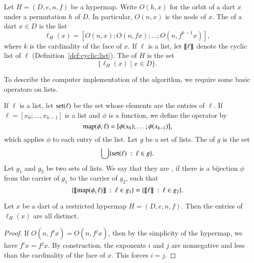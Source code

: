\begin{definition}[listing]
  Let $H=(D,e,n,f)$ be a hypermap.  Write $O(h,x)$ for the orbit of a
  dart $x$ under a permutation $h$ of $D$.  In particular, $O(n,x)$ is
  the node of $x$.  The  of a dart $x\in D$ is the
  list
\[
\ell_H(x) = [O(n,x);O(n,f x);\ldots;O(n,f^{k-1} x)   ], 
\]
where $k$ is the cardinality of the face of $x$.  If $\ell$ is a list,
let ${\llbracket{\ell}\rrbracket}$ denote the cyclic list of $\ell$
(Definition~\ref{def:cyclic:list}).  The  of $H$ is
the set
\[
\{\ell_H(x) \mid x\in D\}.
\]
\end{definition}
%
%

To describe the computer implementation of the algorithm, we require
some basic operators on lists.

\begin{definition}
  If $\ell$ is a list, let ${\operatorname{set}}(\ell)$ be the set whose elements
  are the entries of $\ell$.  If $\ell=[x_0;\ldots,x_{k-1}]$ is a list
  and $\phi$ is a function, we define the operator  by
\[
{\operatorname{map}}(\phi,\ell) = [\phi(x_0);\ldots;\phi(x_{k-1})],
\]
which applies $\phi$ to each entry of the list.  Let $g$ be a set of
lists.  The  of $g$ is the set
\[
\bigcup \{ {\operatorname{set}}(\ell) \ :\  \ell\in g\}.
\]
Let $g_1$ and $g_2$ be two sets of lists.  We say that they are
, 
if there is a bijection $\phi$ from the
carrier of $g_1$ to the carrier of $g_2$, such that
\[
\{ {\llbracket{{\operatorname{map}}(\phi,\ell)}\rrbracket} \ :\  \ell \in g_1 \} = 
\{ {\llbracket{\ell}\rrbracket} \ :\  \ell \in g_2 \}.
\]
\end{definition}
%
%
%
%

\begin{lemma}\label{lemma:distinct:listing}
  Let $x$ be a dart of a restricted hypermap $H=(D,e,n,f)$.  Then the
  entries of $\ell_H(x)$ are all distinct.
\end{lemma}

\begin{proof}
  If $O(n,f^i x) = O(n,f^j x)$, then by the simplicity of the
  hypermap, we have $f^i x = f^j x$.  By construction, the exponents
  $i$ and $j$ are nonnegative and less than the cardinality of the
  face of $x$.  This forces $i=j$.
\end{proof}

